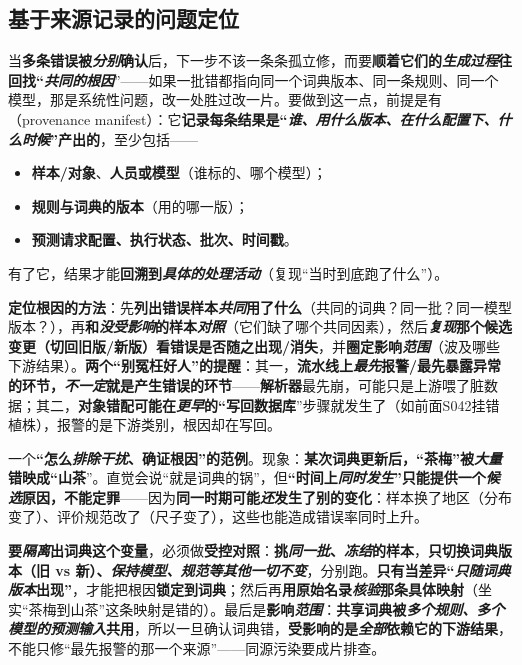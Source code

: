 \subsection{基于来源记录的问题定位}
\label{sec:knowledge-quality-assessment-correction-provenance-localization}

当\textbf{多条错误被\emph{分别}确认}后，下一步不该一条条孤立修，而要\textbf{顺着它们的\emph{生成过程}往回找“\emph{共同的根因}}”——如果一批错都指向同一个词典版本、同一条规则、同一个模型，那是系统性问题，改一处胜过改一片。要做到这一点，前提是有（provenance manifest）：它\textbf{记录每条结果是“\emph{谁、用什么版本、在什么配置下、什么时候}”产出的}，至少包括——
\begin{itemize}\item \textbf{样本/对象}、\textbf{人员或模型}（谁标的、哪个模型）；\item \textbf{规则与词典的版本}（用的哪一版）；\item \textbf{预测请求配置、执行状态、批次、时间戳}。\end{itemize}
有了它，结果才能\textbf{回溯到\emph{具体的处理活动}}（复现“当时到底跑了什么”）。

\textbf{定位根因的方法}：先\textbf{列出错误样本\emph{共同}用了什么}（共同的词典？同一批？同一模型版本？），再\textbf{和\emph{没受影响}的样本\emph{对照}}（它们缺了哪个共同因素），然后\textbf{\emph{复现}那个候选变更（切回旧版/新版）看错误是否随之出现/消失}，并\textbf{圈定影响\emph{范围}}（波及哪些下游结果）。\textbf{两个“别冤枉好人”的提醒}：其一，\textbf{流水线上\emph{最先}报警/最先暴露异常的环节，\emph{不一定}就是产生错误的环节}——\textbf{解析器}最先崩，可能只是上游喂了脏数据；其二，\textbf{对象错配可能在\emph{更早}的“写回数据库}”步骤就发生了（如前面S042挂错植株），报警的是下游类别，根因却在写回。

一个\textbf{“怎么\emph{排除干扰}、确证根因”的范例}。现象：\textbf{某次词典更新后，“茶梅”被\emph{大量}错映成“山茶}”。直觉会说“就是词典的锅”，但\textbf{“时间上\emph{同时发生}”只能提供一个\emph{候选}原因，不能定罪}——因为\textbf{同一时期可能\emph{还}发生了别的变化}：样本换了地区（分布变了）、评价规范改了（尺子变了），这些也能造成错误率同时上升。

\textbf{要\emph{隔离}出词典这个变量}，必须做\textbf{受控对照}：\textbf{挑\emph{同一批}、\emph{冻结}的样本}，\textbf{只切换词典版本（旧 vs 新）、\emph{保持模型、规范等其他一切不变}}，分别跑。\textbf{只有当差异“\emph{只随词典版本}出现”}，才能把根因\textbf{锁定到词典}；然后再\textbf{用原始名录\emph{核验}那条具体映射}（坐实“茶梅到山茶”这条映射是错的）。最后是\textbf{影响\emph{范围}}：\textbf{共享词典被\emph{多个规则、多个模型的预测输入}共用}，所以一旦确认词典错，\textbf{受影响的是\emph{全部}依赖它的下游结果}，不能只修“最先报警的那一个来源”——同源污染要成片排查。

